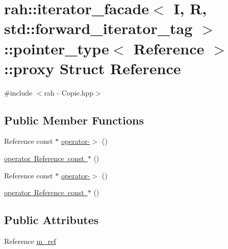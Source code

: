 \hypertarget{structrah_1_1iterator__facade_3_01_i_00_01_r_00_01std_1_1forward__iterator__tag_01_4_1_1pointer__type_1_1proxy}{}\section{rah\+::iterator\+\_\+facade$<$ I, R, std\+::forward\+\_\+iterator\+\_\+tag $>$\+::pointer\+\_\+type$<$ Reference $>$\+::proxy Struct Reference}
\label{structrah_1_1iterator__facade_3_01_i_00_01_r_00_01std_1_1forward__iterator__tag_01_4_1_1pointer__type_1_1proxy}


{\ttfamily \#include $<$rah -\/ Copie.\+hpp$>$}

\subsection*{Public Member Functions}
\begin{DoxyCompactItemize}
\item 
Reference const  $\ast$ \mbox{\hyperlink{structrah_1_1iterator__facade_3_01_i_00_01_r_00_01std_1_1forward__iterator__tag_01_4_1_1pointer__type_1_1proxy_abc11e6f8fe21b3045765f1f3cc0d61ae}{operator-\/$>$}} ()
\item 
\mbox{\hyperlink{structrah_1_1iterator__facade_3_01_i_00_01_r_00_01std_1_1forward__iterator__tag_01_4_1_1pointer__type_1_1proxy_a7a85814c60204b2ed2def8f2d8a7d705}{operator Reference const $\ast$}} ()
\item 
Reference const  $\ast$ \mbox{\hyperlink{structrah_1_1iterator__facade_3_01_i_00_01_r_00_01std_1_1forward__iterator__tag_01_4_1_1pointer__type_1_1proxy_abc11e6f8fe21b3045765f1f3cc0d61ae}{operator-\/$>$}} ()
\item 
\mbox{\hyperlink{structrah_1_1iterator__facade_3_01_i_00_01_r_00_01std_1_1forward__iterator__tag_01_4_1_1pointer__type_1_1proxy_a7a85814c60204b2ed2def8f2d8a7d705}{operator Reference const $\ast$}} ()
\end{DoxyCompactItemize}
\subsection*{Public Attributes}
\begin{DoxyCompactItemize}
\item 
Reference \mbox{\hyperlink{structrah_1_1iterator__facade_3_01_i_00_01_r_00_01std_1_1forward__iterator__tag_01_4_1_1pointer__type_1_1proxy_a5312ff831890ba9940f5aac7f84ecbae}{m\+\_\+ref}}
\end{DoxyCompactItemize}


